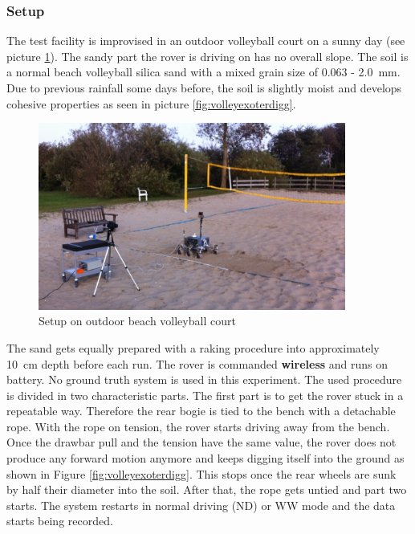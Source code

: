 \documentclass[a4paper,twocolumn]{esapub2005} %
\begin{document}
\subsubsection{Setup} The test facility is improvised in an outdoor volleyball
court on a sunny day (see picture \ref{fig:volley}). The sandy part the rover
is driving on has no overall slope. The soil is a normal beach volleyball
silica sand with a mixed grain size of 0.063 - 2.0~\unit{mm}. Due to previous rainfall
some days before, the soil is slightly moist and develops cohesive properties
as seen in picture \ref{fig:volleyexoterdigg}. 

\begin{figure}[h!]
    \centering
    \includegraphics[width=0.9\textwidth]{volley.jpg}
    \caption{Setup on outdoor beach volleyball court}
    \label{fig:volley}
\end{figure}



The sand gets equally prepared with a raking procedure into approximately
10~\unit{cm} depth before each run.  The rover is commanded \textbf{wireless}
and runs on battery. No ground truth system is used in this experiment. The
used procedure is divided in two characteristic parts. The first part is to get
the rover stuck in a repeatable way. Therefore the rear bogie is tied to the
bench with a detachable rope. With the rope on tension, the rover starts
driving away from the bench. Once the drawbar pull and the tension have the
same value, the rover does not produce any forward motion anymore and keeps
digging itself into the ground as shown in Figure \ref{fig:volleyexoterdigg}.
This stops once the rear wheels are sunk by half their diameter into the soil.
After that, the rope gets untied and part two starts. The system restarts in
normal driving (ND) or WW mode and the data starts being recorded. 
\end{document}
